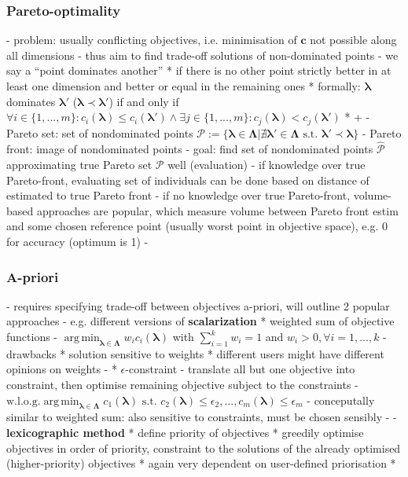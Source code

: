 \documentclass[twoside,11pt]{article}
\DeclareMathOperator*{\argmin}{arg\,min}
\begin{document}
\subsubsection{Pareto-optimality}
- problem: usually conflicting objectives, i.e. minimisation of $\boldsymbol{c}$ not possible along all dimensions
- thus aim to find trade-off solutions of non-dominated points
- we say a ``point dominates another''
  * if there is no other point strictly better in at least one dimension and better or equal in the remaining ones
  * formally: $\boldsymbol\lambda$ dominates $\boldsymbol\lambda'$ ($\boldsymbol\lambda\prec\boldsymbol\lambda'$) if and only if
    $\forall i\in\{1,...,m\}:c_i(\boldsymbol\lambda) \le c_i(\boldsymbol\lambda') \wedge \exists j\in\{1,...,m\}:c_j(\boldsymbol\lambda) < c_j(\boldsymbol\lambda')$
  * \citep[pp. 7f]{10.1145/3610536} + \citep[pp. 198f]{genetic_algos}
- Pareto set: set of nondominated points $\mathcal{P}:=\{\boldsymbol\lambda\in\boldsymbol\Lambda|\nexists\boldsymbol\lambda'\in\boldsymbol\Lambda\text{ s.t. }\boldsymbol\lambda'\prec\boldsymbol\lambda\}$
- Pareto front: image of nondominated points
- goal: find set of nondominated points $\hat{\mathcal{P}}$ approximating true Pareto set $\mathcal{P}$ well
(evaluation)
- if knowledge over true Pareto-front, evaluating set of individuals can be done based on distance of estimated to true Pareto front
- if no knowledge over true Pareto-front, volume-based approaches are popular, which measure volume between Pareto front estim and some chosen
  reference point (usually worst point in objective space), e.g. 0 for accuracy (optimum is 1)
- \citep[pp. 8-10]{10.1145/3610536}
\subsubsection{A-priori}
- requires specifying trade-off between objectives a-priori, will outline 2 popular approaches
- e.g. different versions of \textbf{scalarization}
  * weighted sum of objective functions
    - $\argmin_{\boldsymbol\lambda\in\boldsymbol\Lambda} w_i c_i(\boldsymbol\lambda)$ with $\sum_{i=1}^k w_i=1$ and $w_i>0,\forall i=1,...,k$
    - drawbacks
      * solution sensitive to weights
      * different users might have different opinions on weights \citep[chap. 3.1]{NSGA}
    - \citep[p. 11]{10.1145/3610536}
  * $\epsilon$-constraint
    - translate all but one objective into constraint, then optimise remaining objective subject to the constraints
    - $\text{w.l.o.g.} \argmin_{\boldsymbol\lambda\in\boldsymbol\Lambda} c_1(\boldsymbol\lambda) \text{ s.t. } c_2(\boldsymbol\lambda)\le\epsilon_2,...,c_m(\boldsymbol\lambda)\le\epsilon_m$
    - conceputally similar to weighted sum: also sensitive to constraints, must be chosen sensibly
    - \citep[p. 12]{10.1145/3610536}
- \textbf{lexicographic method}
  * define priority of objectives
  * greedily optimise objectives in order of priority, constraint to the solutions of the already optimised (higher-priority) objectives
  * again very dependent on user-defined priorisation
  * \citep[p. 13749]{lexicographic_MOO}  %
\end{document}
